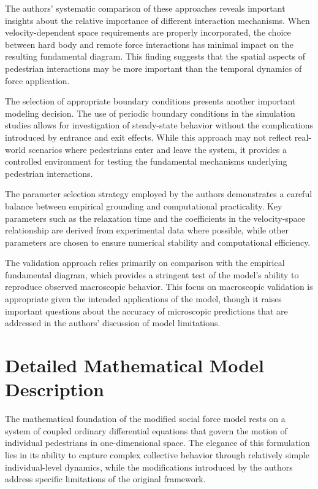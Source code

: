 \documentclass[12pt,a4paper]{article}
\begin{document}
The authors' systematic comparison of these approaches reveals important insights about the relative importance of different interaction mechanisms. When velocity-dependent space requirements are properly incorporated, the choice between hard body and remote force interactions has minimal impact on the resulting fundamental diagram. This finding suggests that the spatial aspects of pedestrian interactions may be more important than the temporal dynamics of force application.

The selection of appropriate boundary conditions presents another important modeling decision. The use of periodic boundary conditions in the simulation studies allows for investigation of steady-state behavior without the complications introduced by entrance and exit effects. While this approach may not reflect real-world scenarios where pedestrians enter and leave the system, it provides a controlled environment for testing the fundamental mechanisms underlying pedestrian interactions.

The parameter selection strategy employed by the authors demonstrates a careful balance between empirical grounding and computational practicality. Key parameters such as the relaxation time and the coefficients in the velocity-space relationship are derived from experimental data where possible, while other parameters are chosen to ensure numerical stability and computational efficiency.

The validation approach relies primarily on comparison with the empirical fundamental diagram, which provides a stringent test of the model's ability to reproduce observed macroscopic behavior. This focus on macroscopic validation is appropriate given the intended applications of the model, though it raises important questions about the accuracy of microscopic predictions that are addressed in the authors' discussion of model limitations.

\section{Detailed Mathematical Model Description}

The mathematical foundation of the modified social force model rests on a system of coupled ordinary differential equations that govern the motion of individual pedestrians in one-dimensional space. The elegance of this formulation lies in its ability to capture complex collective behavior through relatively simple individual-level dynamics, while the modifications introduced by the authors address specific limitations of the original framework.
\end{document}

